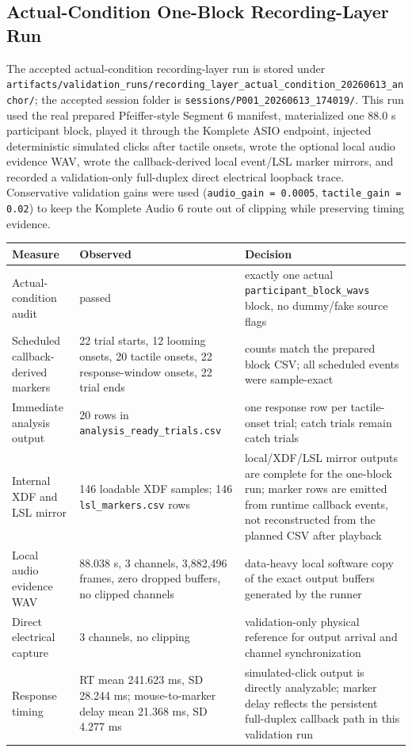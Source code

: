 \documentclass[11pt]{article}
\begin{document}
\subsection{Actual-Condition One-Block Recording-Layer Run}

The accepted actual-condition recording-layer run is stored under
\texttt{artifacts/validation\_runs/recording\_layer\_actual\_condition\_20260613\_anchor/};
the accepted session folder is
\texttt{sessions/P001\_20260613\_174019/}. This run used the real prepared
Pfeiffer-style Segment 6 manifest, materialized one 88.0 s participant block,
played it through the Komplete ASIO endpoint, injected deterministic simulated
clicks after tactile onsets, wrote the optional local audio evidence WAV, wrote
the callback-derived local event/LSL marker mirrors, and recorded a
validation-only full-duplex direct electrical loopback trace. Conservative
validation gains were used (\texttt{audio\_gain = 0.0005},
\texttt{tactile\_gain = 0.02}) to keep the Komplete Audio 6 route out of
clipping while preserving timing evidence.

\begin{longtable}{|p{}|p{}|p{}|}
\hline
\textbf{Measure} & \textbf{Observed} & \textbf{Decision} \\
\hline
Actual-condition audit & passed & exactly one actual
\texttt{participant\_block\_wavs} block, no dummy/fake source flags \\
\hline
Scheduled callback-derived markers & 22 trial starts, 12 looming onsets, 20
tactile onsets, 22 response-window onsets, 22 trial ends & counts match the
prepared block CSV; all scheduled events were sample-exact \\
\hline
Immediate analysis output & 20 rows in
\texttt{analysis\_ready\_trials.csv} & one response row per tactile-onset
trial; catch trials remain catch trials \\
\hline
Internal XDF and LSL mirror & 146 loadable XDF samples; 146
\texttt{lsl\_markers.csv} rows & local/XDF/LSL mirror outputs are complete for
the one-block run; marker rows are emitted from runtime callback events, not
reconstructed from the planned CSV after playback \\
\hline
Local audio evidence WAV & 88.038 s, 3 channels, 3,882,496 frames, zero dropped
buffers, no clipped channels & data-heavy local software copy of the exact
output buffers generated by the runner \\
\hline
Direct electrical capture & 3 channels, no clipping & validation-only physical
reference for output arrival and channel synchronization \\
\hline
Response timing & RT mean 241.623 ms, SD 28.244 ms; mouse-to-marker delay mean
21.368 ms, SD 4.277 ms & simulated-click output is directly analyzable; marker
delay reflects the persistent full-duplex callback path in this validation run
\\
\hline
\end{longtable}
\end{document}
